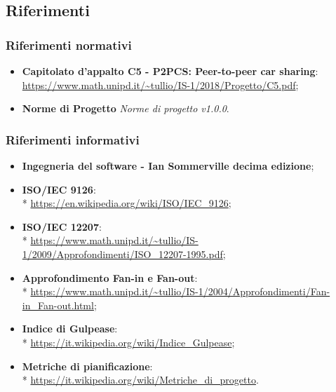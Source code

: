 \subsection{Riferimenti}
\subsubsection{Riferimenti normativi}
\begin{itemize}

\item \textbf{Capitolato d'appalto C5 - P2PCS: Peer-to-peer car sharing}: \\ \url{https://www.math.unipd.it/~tullio/IS-1/2018/Progetto/C5.pdf};
\item \textbf{Norme di Progetto} \textit{Norme di progetto v1.0.0}.
\end{itemize}
\subsubsection{Riferimenti informativi}
\begin{itemize}
\item \textbf{Ingegneria del software - Ian Sommerville decima edizione};
\item \textbf{ISO/IEC 9126}: \\* \url{https://en.wikipedia.org/wiki/ISO/IEC_9126};
\item \textbf{ISO/IEC 12207}: \\* 
\url{https://www.math.unipd.it/~tullio/IS-1/2009/Approfondimenti/ISO\_12207-1995.pdf};
\item \textbf{Approfondimento Fan-in e Fan-out}: \\*
\url{https://www.math.unipd.it/~tullio/IS-1/2004/Approfondimenti/Fan-in_Fan-out.html};
\item \textbf{Indice di Gulpease}: \\* \url{https://it.wikipedia.org/wiki/Indice_Gulpease};
\item \textbf{Metriche di pianificazione}: \\* \url{https://it.wikipedia.org/wiki/Metriche_di_progetto}.
\end{itemize}